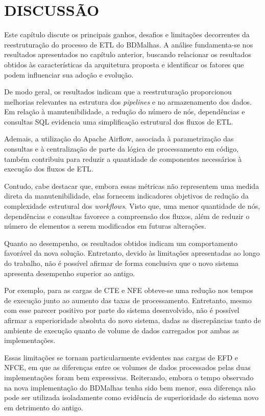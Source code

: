 
\chapter{DISCUSSÃO}
\label{chap:discussao}
\thispagestyle{myheadings}

Este capítulo discute os principais ganhos, desafios e limitações decorrentes da reestruturação
do processo de ETL do BDMalhas. A análise fundamenta-se nos resultados apresentados no
capítulo anterior, buscando relacionar os resultados obtidos às características da arquitetura
proposta e identificar os fatores que podem influenciar sua adoção e evolução.

De modo geral, os resultados indicam que a reestruturação proporcionou melhorias relevantes
na estrutura dos \textit{pipelines} e no armazenamento dos dados. Em relação à manutenibilidade,
a redução do número de nós, dependências e consultas SQL evidencia uma simplificação
estrutural dos fluxos de ETL. 

Ademais, a utilização do Apache Airflow, associada à parametrização das
consultas e à centralização de parte da lógica de processamento em código, também contribuiu
para reduzir a quantidade de componentes necessários à execução dos fluxos de ETL.

Contudo, cabe destacar que, embora essas métricas não representem uma medida direta da 
manutenibilidade, elas fornecem indicadores objetivos de redução da complexidade estrutural 
dos \textit{workflows}. Visto que, uma menor quantidade de nós, dependências e consultas favorece
a compreensão dos fluxos, além de reduzir o número de elementos a serem modificados em futuras 
alterações. 

Quanto ao desempenho, os resultados obtidos indicam um comportamento favorável da nova solução. 
Entretanto, devido às limitações apresentadas ao longo do trabalho, não é possível afirmar de 
forma conclusiva que o novo sistema apresenta desempenho superior ao antigo.
 
Por exemplo, para as cargas de CTE e NFE obteve-se uma redução nos tempos de execução
junto ao aumento das taxas de processamento. Entretanto, mesmo com esse parecer positivo
por parte do sistema desenvolvido, não é possível afirmar a superioridade absoluta do novo sistema,
dadas as discrepâncias tanto de ambiente de execução quanto de volume de dados carregados
por ambas as implementações.

Essas limitações se tornam particularmente evidentes nas cargas de EFD e NFCE, em que as 
diferenças entre os volumes de dados processados pelas duas implementações foram bem expressivas. 
Reiterando, embora o tempo observado na nova implementação do BDMalhas tenha sido bem menor, 
essa diferença não pode ser utilizada isoladamente como evidência de superioridade do sistema
novo em detrimento do antigo.

